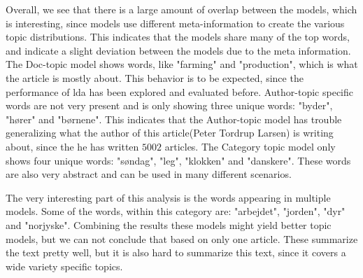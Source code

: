 Overall, we see that there is a large amount of overlap between the models, which is interesting, since models use different meta-information to create the various topic distributions.
This indicates that the models share many of the top words, and indicate a slight deviation between the models due to the meta information.
The Doc-topic model shows words, like "farming" and "production", which is what the article is mostly about.
This behavior is to be expected, since the performance of \gls{lda} has been explored and evaluated before. 
Author-topic specific words are not very present and is only showing three unique words: "byder", "hører" and "børnene".
This indicates that the Author-topic model has trouble generalizing what the author of this article(Peter Tordrup Larsen) is writing about, since the he has written $5002$ articles. 
The Category topic model only shows four unique words: "søndag", "leg", "klokken" and "danskere".
These words are also very abstract and can be used in many different scenarios.

The very interesting part of this analysis is the words appearing in multiple models.
Some of the words, within this category are: "arbejdet", "jorden", "dyr" and "norjyske".
Combining the results these models might yield better topic models, but we can not conclude that based on only one article.
These summarize the text pretty well, but it is also hard to summarize this text, since it covers a wide variety specific topics.
